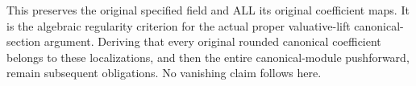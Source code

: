 This preserves the original specified field and ALL its original
coefficient maps. It is the algebraic regularity criterion for the
actual proper valuative-lift canonical-section argument. Deriving
that every original rounded canonical coefficient belongs to these
localizations, and then the entire canonical-module pushforward,
remain subsequent obligations. No vanishing claim follows here.
